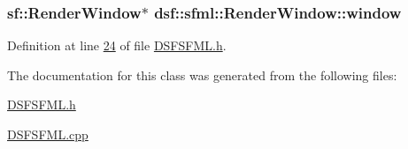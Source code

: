 \subsubsection[{window}]{\setlength{\rightskip}{0pt plus 5cm}sf\+::\+Render\+Window$\ast$ dsf\+::sfml\+::\+Render\+Window\+::window}\label{classdsf_1_1sfml_1_1_render_window_a2c04b61ca1bfba140120001c4a9a30e1}


Definition at line \hyperlink{_d_s_f_s_f_m_l_8h_source_l00024}{24} of file \hyperlink{_d_s_f_s_f_m_l_8h_source}{D\+S\+F\+S\+F\+M\+L.\+h}.



The documentation for this class was generated from the following files\+:\begin{DoxyCompactItemize}
\item 
\hyperlink{_d_s_f_s_f_m_l_8h}{D\+S\+F\+S\+F\+M\+L.\+h}\item 
\hyperlink{_d_s_f_s_f_m_l_8cpp}{D\+S\+F\+S\+F\+M\+L.\+cpp}\end{DoxyCompactItemize}
